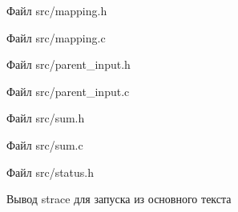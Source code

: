 \documentclass[12pt,a4paper]{article}
\begin{document}
\begin{listingblock}{Файл src/mapping.h}
\end{listingblock}

\begin{listingblock}{Файл src/mapping.c}
\end{listingblock}

\begin{listingblock}{Файл src/parent\_input.h}
\end{listingblock}

\begin{listingblock}{Файл src/parent\_input.c}
\end{listingblock}

\begin{listingblock}{Файл src/sum.h}
\end{listingblock}

\begin{listingblock}{Файл src/sum.c}
\end{listingblock}

\begin{listingblock}{Файл src/status.h}
\end{listingblock}

\begin{listingblock}{Вывод strace для запуска из основного текста}
\end{listingblock}
\end{document}
